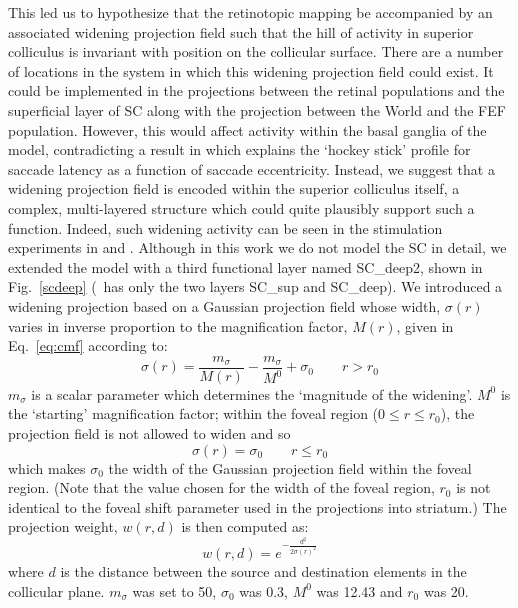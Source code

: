 \documentclass{frontiersSCNS}
\begin{document}
This led us to hypothesize that the retinotopic mapping be accompanied
by an associated widening projection field such that the hill of
activity in superior colliculus is invariant with position on the
collicular surface. There are a number of locations in the system in
which this widening projection field could exist. It could be
implemented in the projections between the retinal populations and the
superficial layer of SC along with the projection between the World
and the FEF population. However, this would affect activity within the
basal ganglia of the model, contradicting a result
in \cite{cope_basal_2017} which explains the `hockey stick' profile
for saccade latency as a function of saccade eccentricity. Instead, we
suggest that a widening projection field is encoded within the
superior colliculus itself, a complex, multi-layered structure which
could quite plausibly support such a function. Indeed, such widening
activity can be seen in the stimulation experiments
in \cite{vokoun_intralaminar_2010}
and \cite{vokoun_response_2014}. Although in this work we do not model
the SC in detail, we extended the model with a third functional layer named SC\_deep2, shown in Fig.~\ref{scdeep}
(\ccg~has only the two layers SC\_sup and SC\_deep). We
introduced a widening projection based on a Gaussian projection field
whose width, $\sigma(r)$ varies in inverse proportion to the
magnification factor, $M(r)$, given in Eq.~\ref{eq:cmf} according to:
\begin{equation} \label{eq:sigmar}
\sigma(r) = \frac{m_{\sigma}}{M(r)} - \frac{m_{\sigma}}{M^0} + \sigma_0 \qquad r > r_0
\end{equation}
$m_{\sigma}$ is a scalar parameter which determines the `magnitude
of the widening'. $M^0$ is the `starting' magnification factor;
within the foveal region ($0 \leq r \leq r_0$), the projection field
is not allowed to widen and so
\begin{equation} \label{eq:sigmar2}
\sigma(r) = \sigma_0 \qquad r \leq r_0
\end{equation}
which makes $\sigma_0$ the width of the Gaussian projection field
within the foveal region. (Note that the value chosen for the width
of the foveal region, $r_0$ is not identical to the foveal shift parameter used
in the  projections into striatum.)
The  projection weight, $w(r,d)$ is then
computed as:
\begin{equation} \label{eq:widening}
w(r,d) = e^{-\frac{d^2}{2\sigma\left(r\right)^2}}
\end{equation}
where $d$ is the distance between the source and destination
elements in the collicular plane.  $m_\sigma$ was set to 50, $\sigma_0$
was 0.3, $M^0$ was 12.43 and $r_0$ was 20.
\end{document}
